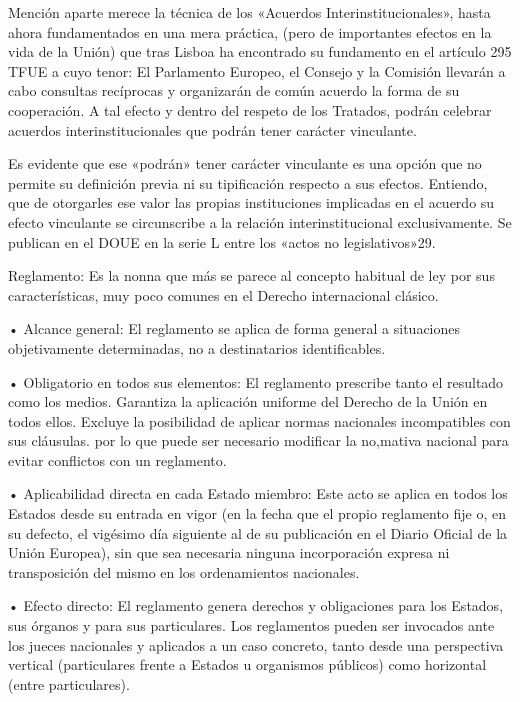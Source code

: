 \documentclass[10pt,a4paper]{article}
\begin{document}
Mención aparte merece la técnica de los «Acuerdos Interinstitucionales», hasta ahora fundamentados en una mera práctica, (pero de importantes efectos en la vida de la Unión) que tras Lisboa ha encontrado su fundamento en el artículo 295 TFUE a cuyo tenor: El Parlamento Europeo, el Consejo y la Comisión llevarán a cabo consultas recíprocas y organizarán de común acuerdo la forma de su cooperación. A tal efecto y dentro del respeto de los Tratados, podrán celebrar acuerdos interinstitucionales que podrán tener carácter vinculante.

Es evidente que ese «podrán» tener carácter vinculante es una opción que no permite su definición previa ni su tipificación respecto a sus efectos. Entiendo, que de otorgarles ese valor las propias instituciones implicadas en el acuerdo su efecto vinculante se circunscribe a la relación interinstitucional exclusivamente. Se publican en el DOUE en la serie L entre los «actos no legislativos»29.



Reglamento: Es la nonna que más se parece al concepto habitual de ley por sus características, muy poco comunes en el Derecho internacional clásico.

• Alcance general: El reglamento se aplica de forma general a situaciones objetivamente determinadas, no a destinatarios identificables.

• Obligatorio en todos sus elementos: El reglamento prescribe tanto el resultado como los medios. Garantiza la aplicación uniforme del Derecho de la Unión en todos ellos. Excluye la posibilidad de aplicar normas nacionales incompatibles con sus cláusulas. por lo que puede ser necesario modificar la no,mativa nacional para evitar conflictos con un reglamento.

• Aplicabilidad directa en cada Estado miembro: Este acto se aplica en todos los Estados desde su entrada en vigor (en la fecha que el propio reglamento fije o, en su defecto, el vigésimo día siguiente al de su publicación en el Diario Oficial de la Unión Europea), sin que sea necesaria ninguna incorporación expresa ni transposición del mismo en los ordenamientos nacionales.

• Efecto directo: El reglamento genera derechos y obligaciones para los Estados, sus órganos y para sus particulares. Los reglamentos pueden ser invocados ante los jueces nacionales y aplicados a un caso concreto, tanto desde una perspectiva vertical (particulares frente a Estados u organismos públicos) como horizontal (entre particulares).
\end{document}
